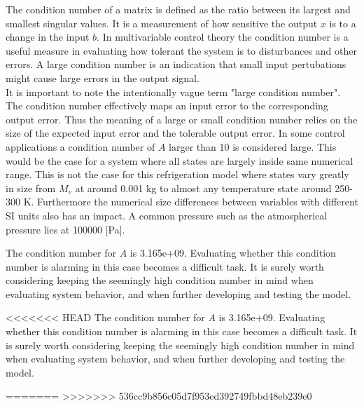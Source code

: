 The condition number of a matrix is defined as the ratio between its largest and smallest singular values. It is a measurement of how sensitive the output $x$ is to a change in the input $b$. In multivariable control theory the condition number is a useful measure in evaluating how tolerant the system is to disturbances and other errors. A large condition number is an indication that small input pertubations might cause large errors in the output signal.\\

It is important to note the intentionally vague term "large condition number". The condition number effectively maps an input error to the corresponding output error. Thus the meaning of a large or small condition number relies on the size of the expected input error and the tolerable output error. In some control applications a condition number of $A$ larger than 10 is considered large. This would be the case for a system where all states are largely inside same numerical range. This is not the case for this refrigeration model where states vary greatly in size from $M_v$ at around 0.001 \si{kg} to almost any temperature state around 250-300 \si{K}. Furthermore the numerical size differences between variables with different SI units also has an impact. A common pressure such as the atmospherical pressure lies at 100000 [Pa].

The condition number for $A$ is 3.165e+09. Evaluating whether this condition number is alarming in this case becomes a difficult task. It is surely worth considering keeping the seemingly high condition number in mind when evaluating system behavior, and when further developing and testing the model.

<<<<<<< HEAD
The condition number for $A$ is 3.165e+09. Evaluating whether this condition number is alarming in this case becomes a difficult task. It is surely worth considering keeping the seemingly high condition number in mind when evaluating system behavior, and when further developing and testing the model.

=======
>>>>>>> 536cc9b856c05d7f953ed392749fbbd48eb239e0


